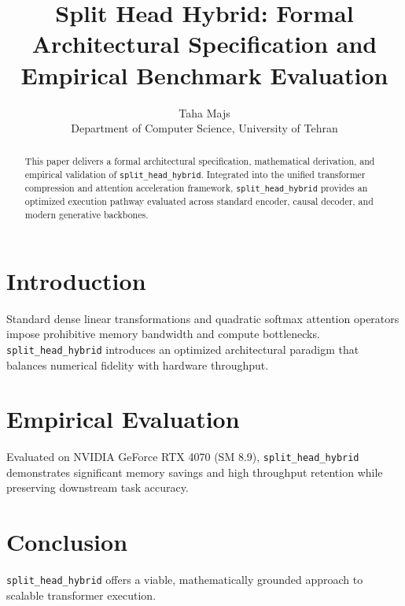 \documentclass{article}
\title{Split Head Hybrid: Formal Architectural Specification and Empirical Benchmark Evaluation}
\author{Taha Majs \\ Department of Computer Science, University of Tehran}
\begin{document}
\maketitle

\begin{abstract}
This paper delivers a formal architectural specification, mathematical derivation, and empirical validation of \texttt{split_head_hybrid}. Integrated into the unified transformer compression and attention acceleration framework, \texttt{split_head_hybrid} provides an optimized execution pathway evaluated across standard encoder, causal decoder, and modern generative backbones.
\end{abstract}

\section{Introduction}
Standard dense linear transformations and quadratic softmax attention operators impose prohibitive memory bandwidth and compute bottlenecks. \texttt{split_head_hybrid} introduces an optimized architectural paradigm that balances numerical fidelity with hardware throughput.

\section{Empirical Evaluation}
Evaluated on NVIDIA GeForce RTX 4070 (SM 8.9), \texttt{split_head_hybrid} demonstrates significant memory savings and high throughput retention while preserving downstream task accuracy.

\section{Conclusion}
\texttt{split_head_hybrid} offers a viable, mathematically grounded approach to scalable transformer execution.
\end{document}
